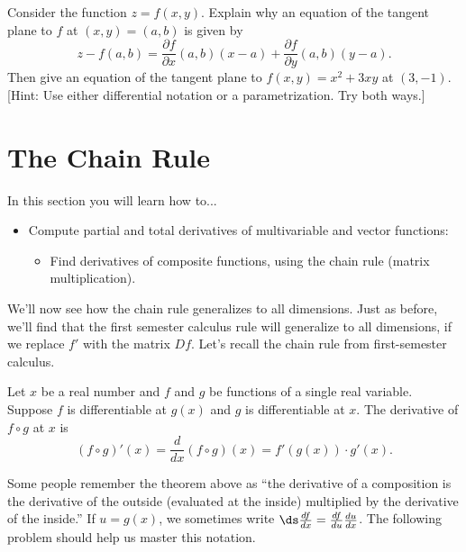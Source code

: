 \begin{problem}
 Consider the function $z=f(x,y)$. Explain why an equation of the tangent plane to $f$ at $(x,y)=(a,b)$ is given by  
$$z-f(a,b) = \frac{\partial f}{\partial x}(a,b) (x-a) +  \frac{\partial f}{\partial y}(a,b) (y-a).$$
Then give an equation of the tangent plane to $f(x,y) = x^2+3xy$ at $(3,-1)$. 
[Hint: Use either differential notation or a parametrization. Try both ways.]
\end{problem}

%
{}
\normalsize


\section{The Chain Rule}
In this section you will learn how to...
\begin{itemize}
\item Compute partial and total derivatives of multivariable and vector functions:
\begin{itemize}
\item Find derivatives of composite functions, using the chain rule (matrix multiplication).
\end{itemize}
\end{itemize}

We'll now see how the chain rule generalizes to all dimensions.  Just as before, we'll find that the first semester calculus rule will generalize to all dimensions, if we replace $f'$ with the matrix $Df$. 
Let's recall the chain rule from first-semester calculus. 

\begin{theorem}
 Let $x$ be a real number and $f$ and $g$ be functions of a single real variable. Suppose $f$ is differentiable at $g(x)$ and $g$ is differentiable at $x$. The derivative of $f\circ g$ at $x$ is 
$$(f\circ g)'(x) = \frac{d}{dx}(f\circ g)(x) = f'(g(x))\cdot g'(x).$$
\end{theorem}

Some people remember the theorem above as ``the derivative of a composition is the derivative of the outside (evaluated at the inside) multiplied by the derivative of the inside.'' If $u=g(x)$, we sometimes write $\ds \frac{df}{dx}=\frac{df}{du}\frac{du}{dx}$. The following problem should help us master this notation.

